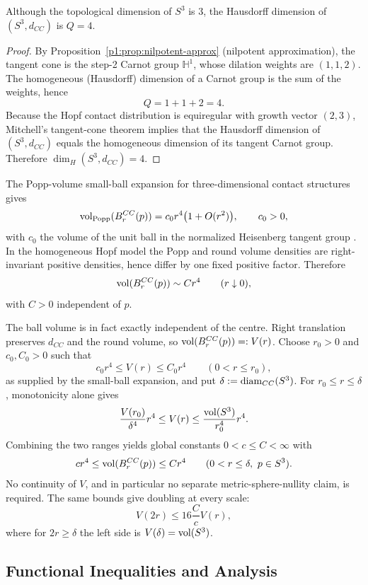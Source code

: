 \documentclass[11pt]{article}
\begin{document}
\begin{corollary}
\label{p1:cor:hausdorff-dim}
Although the topological dimension of $S^3$ is 3, the Hausdorff dimension of $(S^3, d_{CC})$ is $Q=4$.\cite{mitchell1985cc,agrachev2019comprehensive}
\end{corollary}
\begin{proof}
By Proposition~\ref{p1:prop:nilpotent-approx} (nilpotent approximation), the tangent cone is the step-2 Carnot group
$\mathbb H^1$, whose dilation weights are $(1,1,2)$. The homogeneous (Hausdorff) dimension of a Carnot group is the
sum of the weights, hence
\[
Q = 1+1+2=4.
\]
Because the Hopf contact distribution is equiregular with growth vector \((2,3)\), Mitchell's tangent-cone theorem implies that the Hausdorff dimension of \((S^3,d_{CC})\) equals the homogeneous
dimension of its tangent Carnot group. Therefore $\dim_H(S^3,d_{CC})=4$.
\end{proof}

The Popp-volume small-ball expansion for three-dimensional contact structures
gives
\[
  \operatorname{vol}_{\rm Popp}(B_r^{CC}(p))
  =c_0r^4\bigl(1+O(r^2)\bigr),
  \qquad c_0>0,
\]
with \(c_0\) the volume of the unit ball in the normalized Heisenberg tangent
group \cite{BarilariBeschastnyiLerario2020}.  In the homogeneous Hopf model the
Popp and round volume densities are right-invariant positive densities, hence
differ by one fixed positive factor.  Therefore
\[
  \operatorname{vol}(B_r^{CC}(p))\sim C r^4
  \qquad (r\downarrow0),
\]
with \(C>0\) independent of \(p\).

\label{p1:para:cc-doubling}%
The ball volume is in fact exactly independent of the centre.  Right translation
preserves \(d_{CC}\) and the round volume, so
\(\operatorname{vol}(B_r^{CC}(p))=:V(r)\).  Choose \(r_0>0\) and \(c_0,C_0>0\) such that
\[
  c_0r^4\le V(r)\le C_0r^4
  \qquad (0<r\le r_0),
\]
as supplied by the small-ball expansion, and put
\(\delta:=\operatorname{diam}_{CC}(S^3)\).  For \(r_0\le r\le\delta\), monotonicity alone
gives
\[
  \frac{V(r_0)}{\delta^4}r^4
  \le V(r)
  \le \frac{\operatorname{vol}(S^3)}{r_0^4}r^4.
\]
Combining the two ranges yields global constants \(0<c\le C<\infty\) with
\[
  cr^4\le\operatorname{vol}(B_r^{CC}(p))\le Cr^4
  \qquad (0<r\le\delta,\ p\in S^3).
\]
No continuity of \(V\), and in particular no separate metric-sphere-nullity
claim, is required.  The same bounds give doubling at every scale:
\[
  V(2r)\le 16\frac{C}{c}V(r),
\]
where for \(2r\ge\delta\) the left side is \(V(\delta)=\operatorname{vol}(S^3)\).


\subsection{Functional Inequalities and Analysis}
\end{document}
